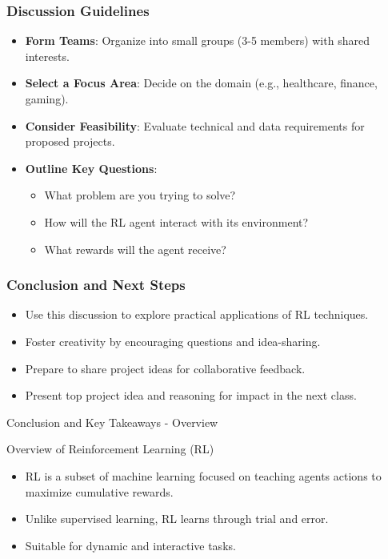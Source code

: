 \documentclass[aspectratio=169]{beamer}
\begin{document}
\begin{frame}[fragile]
    \frametitle{Discussion Guidelines}
    \begin{itemize}
        \item \textbf{Form Teams}: Organize into small groups (3-5 members) with shared interests.
        \item \textbf{Select a Focus Area}: Decide on the domain (e.g., healthcare, finance, gaming).
        \item \textbf{Consider Feasibility}: Evaluate technical and data requirements for proposed projects.
        \item \textbf{Outline Key Questions}:
            \begin{itemize}
                \item What problem are you trying to solve?
                \item How will the RL agent interact with its environment?
                \item What rewards will the agent receive?
            \end{itemize}
    \end{itemize}
\end{frame}

\begin{frame}[fragile]
    \frametitle{Conclusion and Next Steps}
    \begin{itemize}
        \item Use this discussion to explore practical applications of RL techniques.
        \item Foster creativity by encouraging questions and idea-sharing.
        \item Prepare to share project ideas for collaborative feedback.
        \item Present top project idea and reasoning for impact in the next class.
    \end{itemize}
\end{frame}

\begin{frame}[fragile]{Conclusion and Key Takeaways - Overview}
    \begin{block}{Overview of Reinforcement Learning (RL)}
        \begin{itemize}
            \item RL is a subset of machine learning focused on teaching agents actions to maximize cumulative rewards.
            \item Unlike supervised learning, RL learns through trial and error.
            \item Suitable for dynamic and interactive tasks.
        \end{itemize}
    \end{block}
\end{frame}
\end{document}
